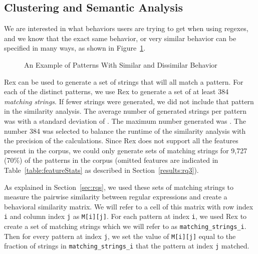 \subsection{Clustering and Semantic Analysis}
We are interested in what behaviors users are trying to get when using regexes, and we know that the exact same behavior, or very similar behavior can be specified in many ways, as shown in Figure~\ref{fig:equivalentPatterns}. 

\begin{figure}[tb]
\centering
{}
\caption{An Example of Patterns With Similar and Dissimilar Behavior}
\label{fig:equivalentPatterns}
\end{figure}

Rex can be used to generate a set of strings that will all match a pattern.  For each of the  distinct patterns, we use Rex to generate a set of at least 384 \emph{matching strings}. If fewer strings were generated, we did not include that pattern in the similarity analysis. The average number of generated strings per pattern was  with a standard deviation of . The maximum number generated was .  The number 384 was selected to balance the runtime of the similarity analysis with the precision of the calculations. Since Rex does not support all the features present in the corpus, we could only generate sets of matching strings for 9,727 (70\%) of the  patterns in the corpus (omitted features are indicated in Table~\ref{table:featureStats} as described in Section~\ref{results:rq3}). 

As explained in Section~\ref{sec:rqs}, we used these sets of matching strings to  measure the pairwise similarity between regular expressions and create a behavioral similarity matrix.  We will refer to a cell of this matrix with row index {\tt i} and column index {\tt j} as {\tt M[i][j]}.  For each pattern at index {\tt i}, we used Rex to create a set of matching strings which we will refer to as {\tt matching\_strings\_i}.  Then for every pattern at index {\tt j}, we set the value of {\tt M[i][j]} equal to the fraction of strings in {\tt matching\_strings\_i} that the pattern at index {\tt j} matched.

